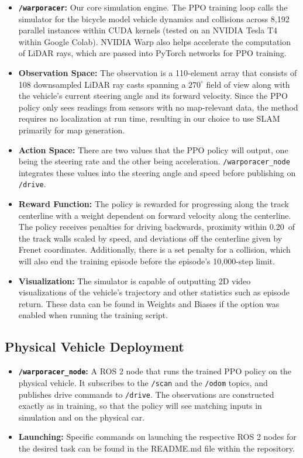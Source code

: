 \documentclass[11pt,letterpaper]{article}
\begin{document}
\begin{itemize}
    \item \textbf{\texttt{/warporacer}:} Our core simulation engine. The PPO training loop calls the simulator for the bicycle model vehicle dynamics and collisions across 8,192 parallel instances
    within CUDA kernels (tested on an NVIDIA Tesla T4 within Google Colab). NVIDIA Warp also helps accelerate the computation of LiDAR rays, which are passed into PyTorch networks for PPO training.
    \item \textbf{Observation Space:} The observation is a 110-element array that consists of 108 downsampled LiDAR ray casts spanning a $270^\circ$ field of view along with the vehicle's current steering angle and its forward velocity.
    Since the PPO policy only sees readings from sensors with no map-relevant data, the method requires no localization at run time, resulting in our choice to use SLAM primarily for map generation.
    \item \textbf{Action Space:} There are two values that the PPO policy will output, one being the steering rate and the other being acceleration. \texttt{/warporacer\_node} integrates these values into the steering angle and speed before publishing on \texttt{/drive}.
    \item \textbf{Reward Function:} The policy is rewarded for progressing along the track centerline with a weight dependent on forward velocity along the centerline. The policy receives
    penalties for driving backwards, proximity within 0.20\, of the track walls scaled by speed, and deviations off the centerline given by Frenet coordinates. Additionally, there is a set penalty for a collision, which will also end the training episode before the episode's 10,000-step limit.
    \item \textbf{Visualization:} The simulator is capable of outputting 2D video visualizations of the vehicle's trajectory and other statistics such as episode return. These data can be found in Weights and Biases if the option was enabled when running the training script.
\end{itemize}

\subsection{Physical Vehicle Deployment}
\begin{itemize}
    \item \textbf{\texttt{/warporacer\_node}:} A ROS 2 node that runs the trained PPO policy on the physical vehicle. It subscribes to the \texttt{/scan} and the \texttt{/odom} topics, and publishes drive commands to \texttt{/drive}. 
    The observations are constructed exactly as in training, so that the policy will see matching inputs in simulation and on the physical car.
    \item \textbf{Launching:} Specific commands on launching the respective ROS 2 nodes for the desired task can be found in the README.md file within the repository.
\end{itemize}
\end{document}
